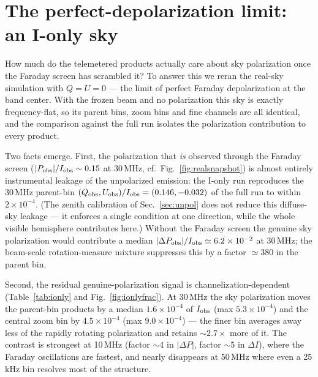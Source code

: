 \documentclass[11pt]{article}
\newcommand{\Iobs}{I_{\rm obs}}
\newcommand{\Qobs}{Q_{\rm obs}}
\newcommand{\Uobs}{U_{\rm obs}}
\begin{document}
\section{The perfect-depolarization limit: an I-only sky}
\label{sec:ionly}

How much do the telemetered products actually care about sky
polarization once the Faraday screen has scrambled it?  To answer
this we reran the real-sky simulation with $Q = U = 0$ — the limit of
perfect Faraday depolarization at the band center.  With the frozen
beam and no polarization this sky is exactly frequency-flat, so its
parent bins, zoom bins and fine channels are all identical, and the
comparison against the full run isolates the polarization
contribution to every product.

Two facts emerge.  First, the polarization that \emph{is} observed
through the Faraday screen ($|P_{\rm obs}|/\Iobs \sim 0.15$ at
30\,MHz, cf.\ Fig.~\ref{fig:realsnapshot}) is almost entirely
instrumental leakage of the unpolarized emission: the I-only run
reproduces the 30\,MHz parent-bin
$(\Qobs, \Uobs)/\Iobs = (0.146, -0.032)$ of the full run to within
$2\times10^{-4}$.  (The zenith calibration of Sec.~\ref{sec:unpol}
does not reduce this diffuse-sky leakage — it enforces a single
condition at one direction, while the whole visible hemisphere
contributes here.)  Without the Faraday screen the genuine sky
polarization would contribute a median
$|\Delta P_{\rm obs}|/\Iobs \simeq 6.2\times10^{-2}$ at 30\,MHz; the
beam-scale rotation-measure mixture suppresses this by a factor
$\simeq 380$ in the parent bin.

Second, the residual genuine-polarization signal is
channelization-dependent (Table~\ref{tab:ionly} and
Fig.~\ref{fig:ionlyfrac}).  At 30\,MHz the sky polarization moves the
parent-bin products by a median $1.6\times10^{-4}$ of $\Iobs$ (max
$5.3\times10^{-4}$) and the central zoom bin by $4.5\times10^{-4}$
(max $9.0\times10^{-4}$) — the finer bin averages away less of the
rapidly rotating polarization and retains $\sim 2.7\times$ more of
it.  The contrast is strongest at 10\,MHz (factor $\sim 4$ in
$|\Delta P|$, factor $\sim 5$ in $\Delta I$), where the Faraday
oscillations are fastest, and nearly disappears at 50\,MHz where even
a 25\,kHz bin resolves most of the structure.
\end{document}
